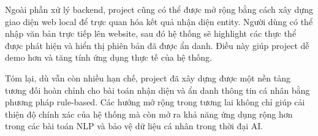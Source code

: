 Ngoài phần xử lý backend, project cũng có thể được mở rộng bằng cách xây dựng giao diện web local để trực quan hóa kết quả nhận diện entity. Người dùng có thể nhập văn bản trực tiếp lên website, sau đó hệ thống sẽ highlight các thực thể được phát hiện và hiển thị phiên bản đã được ẩn danh. Điều này giúp project dễ demo hơn và tăng tính ứng dụng thực tế của hệ thống.

Tóm lại, dù vẫn còn nhiều hạn chế, project đã xây dựng được một nền tảng tương đối hoàn chỉnh cho bài toán nhận diện và ẩn danh thông tin cá nhân bằng phương pháp rule-based. Các hướng mở rộng trong tương lai không chỉ giúp cải thiện độ chính xác của hệ thống mà còn mở ra khả năng ứng dụng rộng hơn trong các bài toán NLP và bảo vệ dữ liệu cá nhân trong thời đại AI.